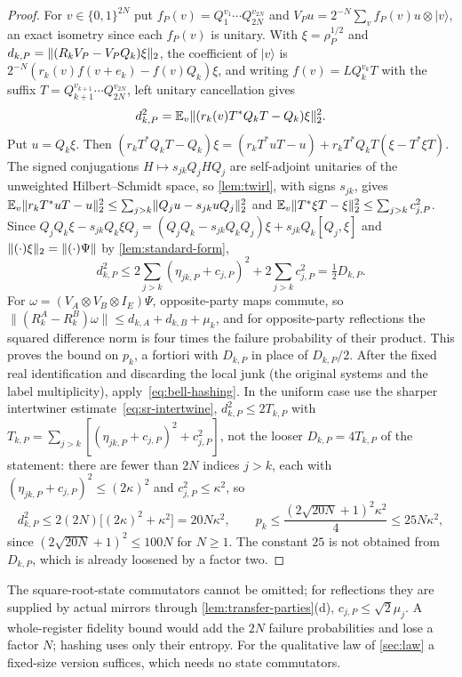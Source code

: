 \begin{proof}
For $v\in\{0,1\}^{2N}$ put $f_P(v)=Q_1^{v_1}\cdots Q_{2N}^{v_{2N}}$ and $V_Pu=2^{-N}\sum_vf_P(v)u\otimes|v\rangle$, an exact
isometry since each $f_P(v)$ is unitary. With $\xi=\rho_P^{1/2}$ and $d_{k,P}=\lVert (R_kV_P-V_PQ_k)\xi\rVert_2$, the coefficient
of $|v\rangle$ is $2^{-N}(r_k(v)f(v+e_k)-f(v)Q_k)\xi$, and writing $f(v)=LQ_k^{v_k}T$ with the suffix
$T=Q_{k+1}^{v_{k+1}}\cdots Q_{2N}^{v_{2N}}$, left unitary cancellation gives
\[
d_{k,P}^2=\mathbb E_v\lVert (r_k(v)T^*Q_kT-Q_k)\xi\rVert_2^2 .
\]
Put $u=Q_k\xi$. Then $(r_kT^*Q_kT-Q_k)\xi=(r_kT^*uT-u)+r_kT^*Q_kT(\xi-T^*\xi T)$. The signed conjugations
$H\mapsto s_{jk}Q_jHQ_j$ are self-adjoint unitaries of the unweighted Hilbert--Schmidt space, so
\cref{lem:twirl}, with signs $s_{jk}$, gives $\mathbb E_v\lVert r_kT^*uT-u\rVert_2^2\le\sum_{j>k}\lVert Q_ju-s_{jk}uQ_j\rVert_2^2$ and
$\mathbb E_v\lVert T^*\xi T-\xi\rVert_2^2\le\sum_{j>k}c_{j,P}^2$. Since $Q_jQ_k\xi-s_{jk}Q_k\xi Q_j=(Q_jQ_k-s_{jk}Q_kQ_j)\xi+s_{jk}Q_k
[Q_j,\xi]$ and $\lVert (\cdot)\xi\rVert_2=\|(\cdot)\Psi\|$ by \cref{lem:standard-form},
\begin{equation}\label{eq:sr-intertwine}
d_{k,P}^2\le2\sum_{j>k}(\eta_{jk,P}+c_{j,P})^2+2\sum_{j>k}c_{j,P}^2=\tfrac12D_{k,P}.
\end{equation}
For $\omega=(V_A\otimes V_B\otimes I_E)\Psi$, opposite-party maps commute, so
$\|(R^A_k-R^B_k)\omega\|\le d_{k,A}+d_{k,B}+\mu_k$, and for opposite-party reflections the squared difference norm is
four times the failure probability of their product. This proves the bound on $p_k$, a fortiori with $D_{k,P}$ in place
of $D_{k,P}/2$. After the fixed real identification and discarding the local junk (the original systems and the label
multiplicity), apply~\eqref{eq:bell-hashing}. In the uniform case use the sharper intertwiner estimate~\eqref{eq:sr-intertwine},
$d_{k,P}^2\le2T_{k,P}$ with $T_{k,P}=\sum_{j>k}[(\eta_{jk,P}+c_{j,P})^2+c_{j,P}^2]$, not the looser $D_{k,P}=4T_{k,P}$ of the statement:
there are fewer than $2N$ indices $j>k$, each with $(\eta_{jk,P}+c_{j,P})^2\le(2\kappa)^2$ and $c_{j,P}^2\le\kappa^2$, so
\[
d_{k,P}^2\le2(2N)\bigl[(2\kappa)^2+\kappa^2\bigr]=20N\kappa^2,\qquad p_k\le\frac{(2\sqrt{20N}+1)^2\kappa^2}4\le25N\kappa^2,
\]
since $(2\sqrt{20N}+1)^2\le100N$ for $N\ge1$. The constant $25$ is not obtained from $D_{k,P}$, which is already loosened by a factor two.
\end{proof}

The square-root-state commutators cannot be omitted; for reflections they are supplied by actual mirrors through
\cref{lem:transfer-parties}(d), $c_{j,P}\le\sqrt2\mu_j$. A whole-register fidelity bound would add the $2N$ failure
probabilities and lose a factor $N$; hashing uses only their entropy. For the qualitative law of \cref{sec:law} a
fixed-size version suffices, which needs no state commutators.

